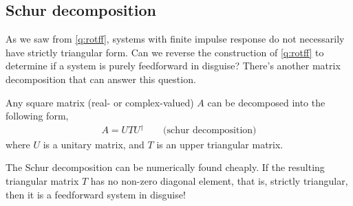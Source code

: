 \documentclass[a4paper,11pt]{exam}
\newcounter{ct}
\newcommand{\ctrp}{{^\dagger}} %
\begin{document}
\begin{questions}

\clearpage
\subsection{Schur decomposition}
As we saw from \ref{q:rotff}, systems with finite impulse response do not necessarily have strictly triangular form.
Can we reverse the construction of \ref{q:rotff} to determine if a system is purely feedforward in disguise?
There's another matrix decomposition that can answer this question.
\begin{tcolorbox}[colback=black!1!,title=Schur decomposition]
    Any square matrix (real- or complex-valued) $A$ can be decomposed into the following form,
    \begin{align}\label{eq:schur}
	A = U T U\ctrp \qquad \text{(schur decomposition)}
    \end{align}
    where $U$ is a unitary matrix, and $T$ is an upper triangular matrix.
\end{tcolorbox}
The Schur decomposition can be numerically found cheaply.
If the resulting triangular matrix $T$ has no non-zero diagonal element, that is, strictly triangular, then it is a feedforward system in disguise!



\end{questions}
\end{document}
